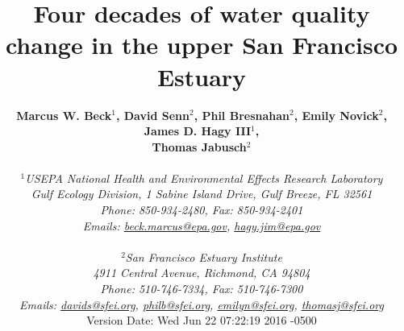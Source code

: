 \documentclass[letterpaper,12pt,oneside]{article}\usepackage[]{graphicx}\usepackage[]{color}
\begin{document}
\raggedbottom
\linenumbers
\raggedright
{}
\setlength{\parindent}{0.5in}
\renewcommand\refname{References \vspace{12pt}}

\begin{singlespace}
\title{{\bf {\Large Four decades of water quality change in the upper San Francisco Estuary}}}
\author{
  {\bf {\normalsize Marcus W. Beck$^1$, David Senn$^2$, Phil Bresnahan$^2$, Emily Novick$^2$, James D. Hagy III$^1$,}}
  \\{\bf {\normalsize Thomas Jabusch$^2$}}
  \\\\{\textit {\normalsize $^1$USEPA National Health and Environmental Effects Research Laboratory}}
  \\{\textit {\normalsize Gulf Ecology Division, 1 Sabine Island Drive, Gulf Breeze, FL 32561}}
	\\{\textit {\normalsize Phone: 850-934-2480, Fax: 850-934-2401}}
	\\{\textit {\normalsize Emails: \href{mailto:beck.marcus@epa.gov}{beck.marcus@epa.gov}, \href{mailto:hagy.jim@epa.gov}{hagy.jim@epa.gov}}}
  \\\\{\textit {\normalsize $^2$San Francisco Estuary Institute}}
	\\{\textit {\normalsize 4911 Central Avenue, Richmond, CA 94804}}
	\\{\textit {\normalsize Phone: 510-746-7334, Fax: 510-746-7300}}
	\\{\textit {\normalsize Emails: \href{mailto:davids@sfei.org}{davids@sfei.org}, \href{mailto:philb@sfei.org}{philb@sfei.org}, \href{mailto:emilyn@sfei.org}{emilyn@sfei.org}, \href{mailto:thomasj@sfei.org}{thomasj@sfei.org}}}
  \vspace{1in} 
  \\ Version Date:   Wed Jun 22 07:22:19 2016 -0500
	}
\date{}
\maketitle
\end{singlespace}
\clearpage
\end{document}

